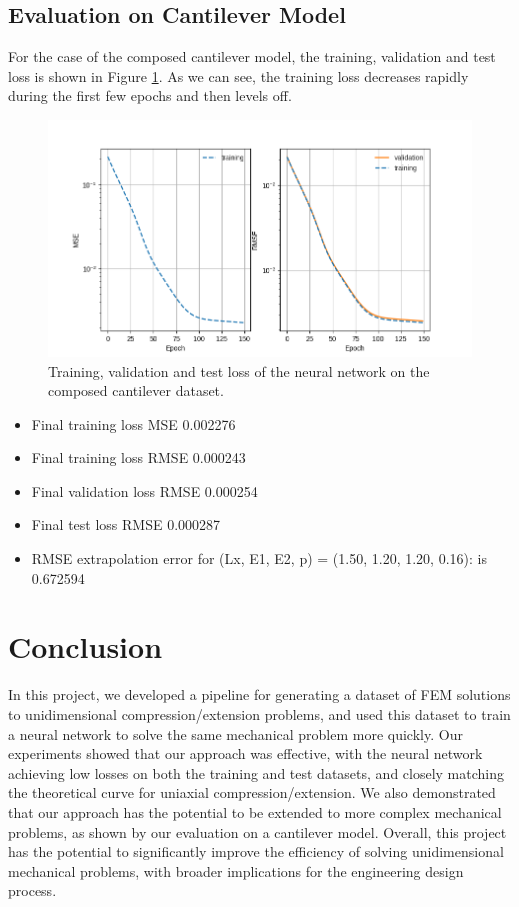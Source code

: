 \documentclass[11pt]{scrartcl} %
\begin{document}
\subsection{Evaluation on Cantilever Model}
For the case of the composed cantilever model, the training, validation and test loss is shown in Figure \ref{fig:composed_cantilever_loss}. As we can see, the training loss decreases rapidly during the first few epochs and then levels off. 

\begin{figure}[h]
\centering
\includegraphics[width=1\textwidth]{Figures/Example2_losses.png}
\caption{Training, validation and test loss of the neural network on the composed cantilever dataset.}
\label{fig:composed_cantilever_loss}
\end{figure}


\begin{itemize}
\item Final training loss MSE 0.002276  
\item Final training loss RMSE 0.000243  
\item Final validation loss RMSE 0.000254  
\item Final test loss RMSE 0.000287  
\item RMSE extrapolation error for (Lx, E1, E2, p) = (1.50, 1.20, 1.20, 0.16): is 0.672594
\end{itemize}

\section{Conclusion}
In this project, we developed a pipeline for generating a dataset of FEM solutions to unidimensional compression/extension problems, and used this dataset to train a neural network to solve the same mechanical problem more quickly. Our experiments showed that our approach was effective, with the neural network achieving low losses on both the training and test datasets, and closely matching the theoretical curve for uniaxial compression/extension. We also demonstrated that our approach has the potential to be extended to more complex mechanical problems, as shown by our evaluation on a cantilever model. Overall, this project has the potential to significantly improve the efficiency of solving unidimensional mechanical problems, with broader implications for the engineering design process.
\end{document}
